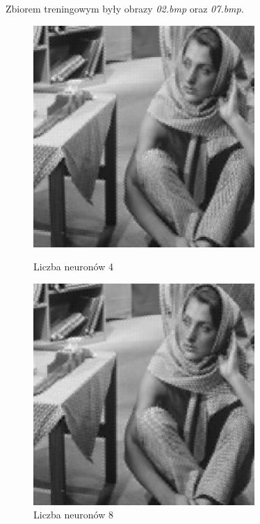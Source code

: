 \documentclass[../EDI_Task4_Karwowski_Kowalewski.tex]{subfiles}
\begin{document}
 {

    Zbiorem treningowym były obrazy \textit{02.bmp} oraz \textit{07.bmp}.
    \begin{figure}[!htbp]
        \begin{minipage}[c]{0.49\linewidth}
            \centering
            \includegraphics[width=0.75\textwidth]{img/results_2/4/compressed_05.png}
            \caption{Liczba neuronów 4}
        \end{minipage}\hfill
        \begin{minipage}[c]{0.49\linewidth}
            \centering
            \includegraphics[width=0.75\textwidth]{img/results_2/8/compressed_05.png}
            \caption{Liczba neuronów 8}
        \end{minipage}
    \end{figure}

}
\end{document}
